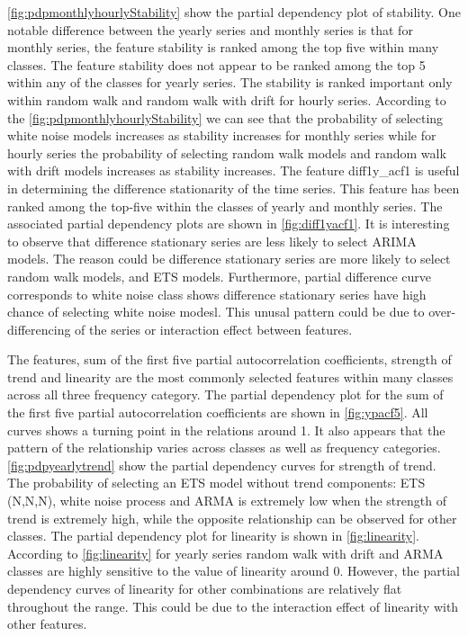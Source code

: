 \documentclass[11pt,a4paper,]{article}
\begin{document}
\autoref{fig:pdpmonthlyhourlyStability} show the partial dependency plot of stability. One notable difference between the yearly series and monthly series is that for monthly series, the feature stability is ranked among the top five within many classes. The feature stability does not appear to be ranked among the top 5 within any of the classes for yearly series. The stability is ranked important only within random walk and random walk with drift for hourly series. According to the \autoref{fig:pdpmonthlyhourlyStability} we can see that the probability of selecting white noise models increases as stability increases for monthly series while for hourly series the probability of selecting random walk models and random walk with drift models increases as stability increases. The feature diff1y\_acf1 is useful in determining the difference stationarity of the time series. This feature has been ranked among the top-five within the classes of yearly and monthly series. The associated partial dependency plots are shown in \autoref{fig:diff1yacf1}. It is interesting to observe that difference stationary series are less likely to select ARIMA models. The reason could be difference stationary series are more likely to select random walk models, and ETS models. Furthermore, partial difference curve corresponds to white noise class shows difference stationary series have high chance of selecting white noise modesl. This unusal pattern could be due to over-differencing of the series or interaction effect between features.

The features, sum of the first five partial autocorrelation coefficients, strength of trend and linearity are the most commonly selected features within many classes across all three frequency category. The partial dependency plot for the sum of the first five partial autocorrelation coefficients are shown in \autoref{fig:ypacf5}. All curves shows a turning point in the relations around 1. It also appears that the pattern of the relationship varies across classes as well as frequency categories. \autoref{fig:pdpyearlytrend} show the partial dependency curves for strength of trend. The probability of selecting an ETS model without trend components: ETS (N,N,N), white noise process and ARMA is extremely low when the strength of trend is extremely high, while the opposite relationship can be observed for other classes. The partial dependency plot for linearity is shown in \autoref{fig:linearity}. According to \autoref{fig:linearity} for yearly series random walk with drift and ARMA classes are highly sensitive to the value of linearity around 0. However, the partial dependency curves of linearity for other combinations are relatively flat throughout the range. This could be due to the interaction effect of linearity with other features.
\end{document}
